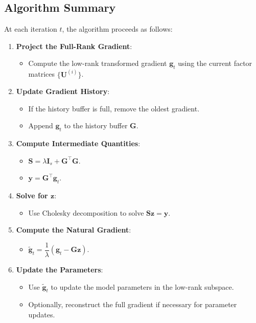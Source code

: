 \subsection{Algorithm Summary}

At each iteration $t$, the algorithm proceeds as follows:

\begin{enumerate}
    \item \textbf{Project the Full-Rank Gradient}:

    \begin{itemize}
        \item Compute the low-rank transformed gradient $\mathbf{g}_t$ using the current factor matrices $\{\mathbf{U}^{(i)}\}$.
    \end{itemize}

    \item \textbf{Update Gradient History}:

    \begin{itemize}
        \item If the history buffer is full, remove the oldest gradient.
        \item Append $\mathbf{g}_t$ to the history buffer $\mathbf{G}$.
    \end{itemize}

    \item \textbf{Compute Intermediate Quantities}:

    \begin{itemize}
        \item $\mathbf{S} = \lambda \mathbf{I}_s + \mathbf{G}^\top \mathbf{G}$.
        \item $\mathbf{y} = \mathbf{G}^\top \mathbf{g}_t$.
    \end{itemize}

    \item \textbf{Solve for $\mathbf{z}$}:

    \begin{itemize}
        \item Use Cholesky decomposition to solve $\mathbf{S} \mathbf{z} = \mathbf{y}$.
    \end{itemize}

    \item \textbf{Compute the Natural Gradient}:

    \begin{itemize}
        \item $\tilde{\mathbf{g}}_t = \dfrac{1}{\lambda} \left( \mathbf{g}_t - \mathbf{G} \mathbf{z} \right)$.
    \end{itemize}

    \item \textbf{Update the Parameters}:

    \begin{itemize}
        \item Use $\tilde{\mathbf{g}}_t$ to update the model parameters in the low-rank subspace.
        \item Optionally, reconstruct the full gradient if necessary for parameter updates.
    \end{itemize}
\end{enumerate}

